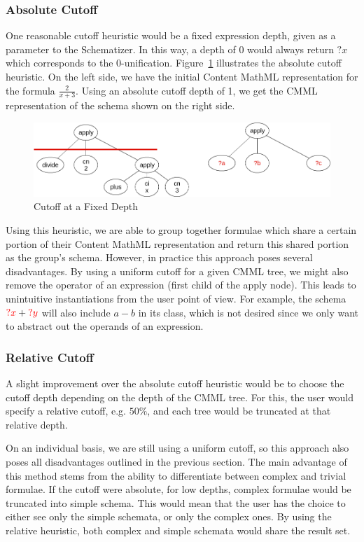 \documentclass[a4paper,oneside]{article}
\def\red#1{\textcolor{red}{#1}}
\def\cmml{\textsf{Content MathML}\xspace}
\begin{document}
\subsubsection{Absolute Cutoff}\label{subsubsec:absolute_cutoff}
One reasonable cutoff heuristic would be a fixed expression depth, given as a
parameter to the Schematizer. In this way, a depth of 0 would always return
$?x$ which corresponds to the 0-unification.
Figure~\ref{fig:cutoff_naive} illustrates the absolute cutoff heuristic.
On the left side, we have the initial \cmml representation for the formula
$\frac{2}{x+3}$. Using an absolute cutoff depth of 1, we get the CMML
representation of the schema shown on the right side.

\begin{figure}[ht]\centering
    \includegraphics[scale=0.3]{img/cutoff_naive.png}
    \caption{Cutoff at a Fixed Depth}\label{fig:cutoff_naive}
\end{figure}
\FloatBarrier

Using this heuristic, we are able to group together formulae which share a
certain portion of their \cmml representation and return this shared portion as
the group's schema. However, in practice this approach poses several
disadvantages. By using a uniform cutoff for a given CMML tree, we might also
remove the operator of an expression (first child of the \textsf{apply} node).
This leads to unintuitive instantiations from the user point of view. For
example, the schema $\red{?x} + \red{?y}$ will also include $a - b$ in its
class, which is not desired since we only want to abstract out the operands of
an expression.

\subsubsection{Relative Cutoff}\label{subsubsec:relative_cutoff}
A slight improvement over the absolute cutoff heuristic would be to choose the
cutoff depth depending on the depth of the CMML tree. For this, the user would
specify a relative cutoff, e.g. $50\%$, and each tree would be truncated at
that relative depth.

On an individual basis, we are still using a uniform cutoff, so this approach
also poses all disadvantages outlined in the previous section. The main
advantage of this method stems from the ability to differentiate between
complex and trivial formulae. If the cutoff were absolute, for low depths,
complex formulae would be truncated into simple schema. This would mean that
the user has the choice to either see only the simple schemata, or only the
complex ones. By using the relative heuristic, both complex and simple schemata
would share the result set.
\end{document}
